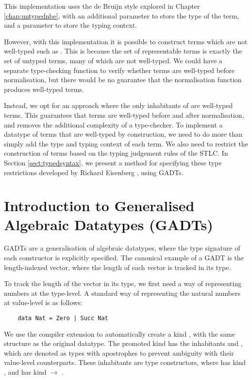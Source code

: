 This implementation uses the de Bruijn style explored in Chapter \ref{chap:untypednbe}, with an additional  parameter to store the type of the term, and a \code{[Ty]} parameter to store the typing context.


However, with this implementation it is possible to construct terms which are not well-typed such as . This is because the set of representable terms is exactly the set of untyped terms, many of which are not well-typed. We could have a separate type-checking function to verify whether terms are well-typed before normalisation, but there would be no guarantee that the normalisation function produces well-typed terms.

Instead, we opt for an approach where the only inhabitants of  are well-typed terms. This guarantees that terms are well-typed before and after normalisation, and removes the additional complexity of a type-checker. To implement a datatype of terms that are well-typed by construction, we need to do more than simply add the type and typing context of each term. We also need to restrict the construction of terms based on the typing judgement rules of the STLC. In Section \ref{sect:typedsyntax}, we present a method for specifying these type restrictions developed by Richard Eisenberg \cite{GADTs}, using GADTs.

\section{Introduction to Generalised Algebraic Datatypes (GADTs)}

GADTs are a generalisation of algebraic datatypes, where the type signature of each constructor is explicitly specified. The canonical example of a GADT is the length-indexed vector, where the length of each vector is tracked in its type.

To track the length of the vector in its type, we first need a way of representing numbers at the type-level. A standard way of representing the natural numbers at value-level is as follows:

\begin{lstlisting}
    data Nat = Zero | Succ Nat
\end{lstlisting}

We use the  compiler extension to automatically create a kind , with the same structure as the original  datatype. The promoted kind  has the inhabitants  and , which are denoted as types with apostrophes to prevent ambiguity with their value-level counterparts. These inhabitants are type constructors, where  has kind , and  has kind  $\rightarrow$ . 

